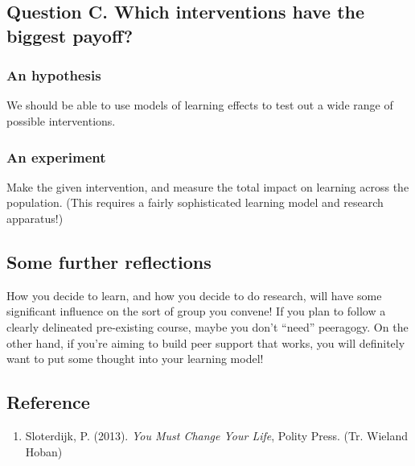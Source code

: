 \subsection{Question C. Which interventions have the biggest payoff?}

\subsubsection{An hypothesis}

We should be able to use models of learning effects to test out a wide
range of possible interventions.

\subsubsection{An experiment}

Make the given intervention, and measure the total impact on learning
across the population. (This requires a fairly sophisticated learning
model and research apparatus!)

\subsection{Some further reflections}

How you decide to learn, and how you decide to do research, will have
some significant influence on the sort of group you convene! If you plan
to follow a clearly delineated pre-existing course, maybe you don't
``need'' peeragogy. On the other hand, if you're aiming to build peer
support that works, you will definitely want to put some thought into
your learning model!

\subsection{Reference}

\begin{enumerate}
\item
  Sloterdijk, P. (2013). \emph{You Must Change Your Life}, Polity Press.
  (Tr. Wieland Hoban)
\end{enumerate}
